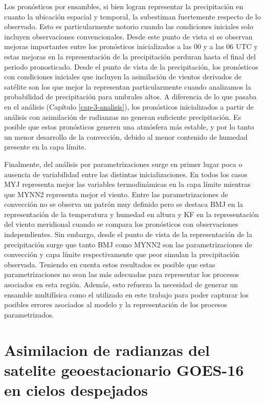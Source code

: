 \documentclass[12pt,oneside,a4paper]{reedthesis}
\begin{document}
Los pronósticos por ensambles, si bien logran representar la precipitación en cuanto la ubicación espacial y temporal, la subestiman fuertemente respecto de lo observado. Esto es particularmente notorio cuando las condiciones iniciales solo incluyen observaciones convencionales. Desde este punto de vista si se observan mejoras importantes entre los pronósticos inicializados a las 00 y a las 06 UTC y estas mejoras en la representación de la precipitación perduran hasta el final del periodo pronosticado. Desde el punto de vista de la precipitación, los pronósticos con condiciones iniciales que incluyen la asimilación de vientos derivados de satélite son los que mejor la representan particularmente cuando analizamos la probabilidad de precipitación para umbrales altos. A diferencia de lo que pasaba en el análisis (Capítulo \ref{cap-3-analisis}), los pronósticos inicializados a partir de análisis con asimilación de radianzas no generan suficiente precipitación. Es posible que estos pronósticos generen una atmósfera más estable, y por lo tanto un menor desarrollo de la convección, debido al menor contenido de humedad presente en la capa límite.

Finalmente, del análisis por parametrizaciones surge en primer lugar poca o ausencia de variabilidad entre las distintas inicializaciones. En todos los casos MYJ representa mejor las variables termodinámicas en la capa límite mientras que MYNN2 representa mejor el viento. Entre las parametrizaciones de convección no se observa un patrón muy definido pero se destaca BMJ en la representación de la temperatura y humedad en altura y KF en la representación del viento meridional cuando se compara los pronósticos con observaciones independientes. Sin embargo, desde el punto de vista de la representación de la precipitación surge que tanto BMJ como MYNN2 son las parametrizaciones de convección y capa límite respectivamente que peor simulan la precipitación observada. Teniendo en cuenta estos resultados es posible que estas parametrizaciones no sean las más adecuadas para representar los procesos asociados en esta región. Además, esto refuerza la necesidad de generar un ensamble multifísica como el utilizado en este trabajo para poder capturar los posibles errores asociados al modelo y la representación de los procesos parametrizados.

\hypertarget{cap-5-goes}{%
\chapter{Asimilacion de radianzas del satelite geoestacionario GOES-16 en cielos despejados}\label{cap-5-goes}}
\end{document}
